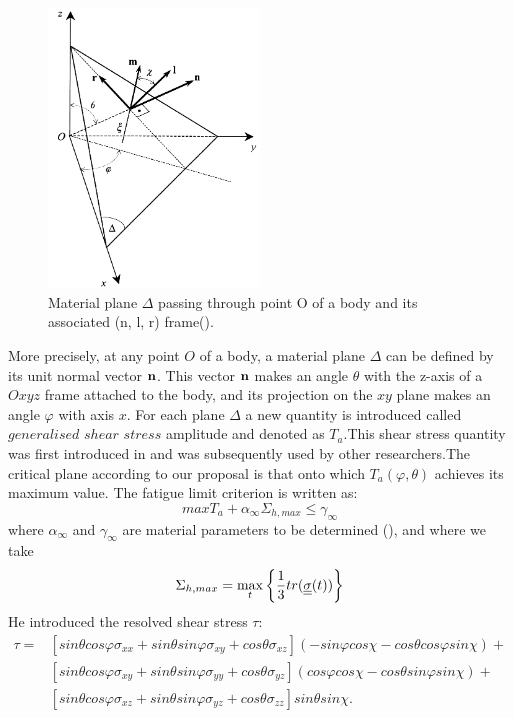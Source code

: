 \begin{figure}[h!]
	\centering
	\includegraphics[width=0.5\textwidth]{figures//demopp.png} 
	\caption{Material plane $\Delta$ passing through point O of a body and its
		associated (n, l, r) frame(\cite{papadopoulos1993fatigue}).}
	\label{fig50}
\end{figure}
More precisely, at any point $O$ of a body, a material plane $\Delta$ can be defined by its unit normal vector $\bf n$. This vector
$\bf n$ makes an angle $\theta$ with the z-axis of a $Oxyz$ frame attached to the body, and its projection on the $xy$ plane
makes an angle $\varphi$ with axis $x$. For each plane $\Delta$ a new quantity is introduced called $generalised$ $shear$ $stress$ amplitude and denoted as $T_a$.This shear stress quantity was first introduced in \cite{papadopoulos2001long}
and was subsequently used by other researchers.The critical plane according to our proposal is that onto which $T_a(\varphi,\theta)$ achieves its maximum value. The fatigue limit criterion is written as:
\begin{equation}
max T_a+\alpha_\infty \Sigma_{h,max}\leqslant \gamma_\infty
\end{equation}
where $\alpha_\infty$ and $\gamma_\infty$ are material parameters to be determined (\cite{papadopoulos2001long}), and where we take
$$\Sigma_{h,max}=\max\limits_{t}\left\lbrace \frac{1}{3}tr(\uline{\uline{\sigma}}(t))\right\rbrace $$
He introduced the resolved shear stress $\tau$:
\begin{equation}
\begin{split}
\tau=&[sin\theta cos\varphi\sigma_{xx}+sin\theta sin\varphi\sigma_{xy}+cos\theta\sigma_{xz}](-sin\varphi cos\chi-cos\theta cos\varphi sin\chi)+\\&[sin\theta cos\varphi\sigma_{xy}+sin\theta sin\varphi\sigma_{yy}+cos\theta\sigma_{yz}](cos\varphi cos\chi-cos\theta sin\varphi sin\chi)+\\&[sin\theta cos\varphi\sigma_{xz}+sin\theta sin\varphi\sigma_{yz}+cos\theta\sigma_{zz}]sin\theta sin\chi .
\end{split} 
\label{eqres}
\end{equation}
